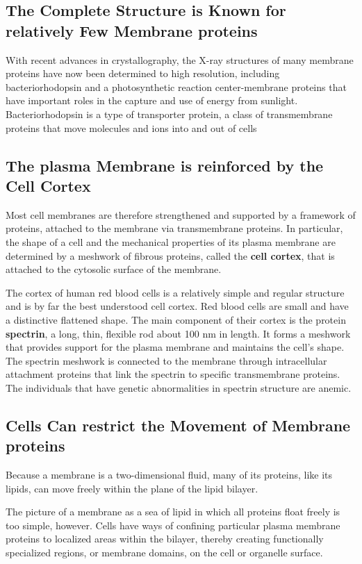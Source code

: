 \subsection{The Complete Structure is Known for relatively Few Membrane proteins}

With recent advances in crystallography, the X-ray structures of many membrane
proteins have now been determined to high resolution, including
bacteriorhodopsin and a photosynthetic reaction center-membrane proteins
that have important roles in the capture and use of energy from sunlight.
Bacteriorhodopsin is a type of transporter protein, a class of
transmembrane proteins that move molecules and ions into and out of
cells

\subsection{The plasma Membrane is reinforced by the Cell Cortex}

Most cell membranes are therefore strengthened
and supported by a framework of proteins, attached to the membrane
via transmembrane proteins. In particular, the shape of a cell and the
mechanical properties of its plasma membrane are determined by a
meshwork of fibrous proteins, called the \textbf{cell cortex}, that is attached to the
cytosolic surface of the membrane.

The cortex of human red blood cells is a relatively simple and regular
structure and is by far the best understood cell cortex. Red blood cells
are small and have a distinctive flattened shape.
The main
component of their cortex is the protein \textbf{spectrin}, a long, thin, flexible
rod about 100 nm in length. It forms a meshwork that provides support
for the plasma membrane and maintains the cell’s shape. The spectrin
meshwork is connected to the membrane through intracellular attachment
proteins that link the spectrin to specific transmembrane proteins.
The individuals that have genetic abnormalities in spectrin structure are anemic.

\subsection{Cells Can restrict the Movement of Membrane proteins}

Because a membrane is a two-dimensional fluid, many of its proteins, like
its lipids, can move freely within the plane of the lipid bilayer.

The picture of a membrane as a sea of lipid in which all proteins float
freely is too simple, however. Cells have ways of confining particular
plasma membrane proteins to localized areas within the bilayer, thereby
creating functionally specialized regions, or membrane domains, on the
cell or organelle surface.

